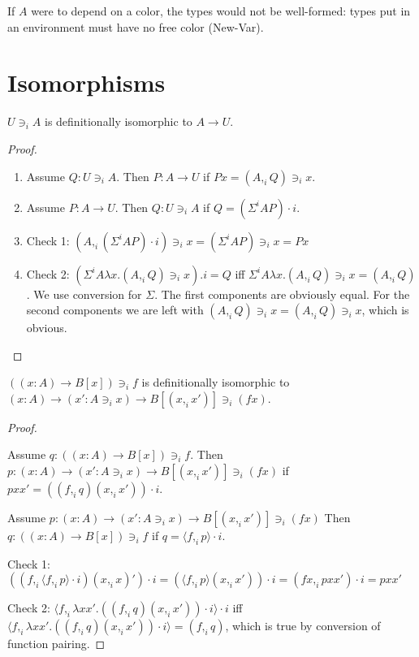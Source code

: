 \documentclass{PaperTools/latex/llncs}
\newcommand\CP[3]{(#2,_{#1} #3)}
\newcommand\CSig[1]{\Sigma^{#1}}
\newcommand\param[1]{\!\cdot\!#1}
\newcommand\op[1]{∋_{#1}}
\newcommand\fp[3]{⟨#2 ,_{#1} #3⟩}
\begin{document}
If $A$ were to depend on a color, the types would not be well-formed:
types put in an environment must have no free color ({\sc New-Var}).

\section{Isomorphisms}


\begin{theorem}
$U \op i A$ is definitionally isomorphic to $A → U$.
\end{theorem}
\begin{proof}~
  \begin{enumerate}
  \item Assume $Q : U \op i A$. Then $P : A → U$ if $P x = \CP i A Q \op i x$.
  \item Assume $P : A → U$. Then $Q : U \op i A$ if $Q = (\CSig i A P) \param i$.
  \item Check 1: $\CP i A {(\CSig i A P) \param i} \op i x = (\CSig i A P) \op i x = P x$
  \item Check 2: $(\CSig i A {λx. \CP i A Q \op i x}).i = Q$ iff $\CSig i A {λx. \CP i A Q \op i x} = \CP i A Q$. We use conversion for $\Sigma$. The first components are obviously equal. For the second components we are left with $\CP i A Q \op i x = \CP i A Q \op i x$, which is obvious.
  \end{enumerate}
\end{proof}

\begin{theorem}
$((x:A) → B[x]) \op i f$ is definitionally isomorphic to $(x:A) → (x' : A \op i x) → B[\CP i x {x'}] \op i (f x)$.
\end{theorem}
\begin{proof}~
  \item Assume $q : ((x:A) → B[x]) \op i f$. Then $p : (x:A) → (x' : A \op i x) → B[\CP i x {x'}] \op i (f x)$ if $p x x' = (\CP i f q \CP i x {x'}) \param i$.
  \item Assume $p : (x:A) → (x' : A \op i x) → B[\CP i x {x'}] \op i (f x)$ Then $q : ((x:A) → B[x]) \op i f$ if $q = \fp i f p \param i$.
  \item Check 1: $(\CP i f {\fp i f p \param i} \CP i x x') \param i = ({\fp i f p} \CP i x {x'}) \param i = \CP i {f x} {p x x'} \param i = p x x' $
  \item Check 2: $\fp i f {λx x'. (\CP i f q \CP i x {x'}) \param i} \param i$ iff $\fp i f {λx x'. (\CP i f q \CP i x {x'}) \param i} = \CP i f q$, which is true by conversion of function pairing.
\end{proof}
\end{document}

